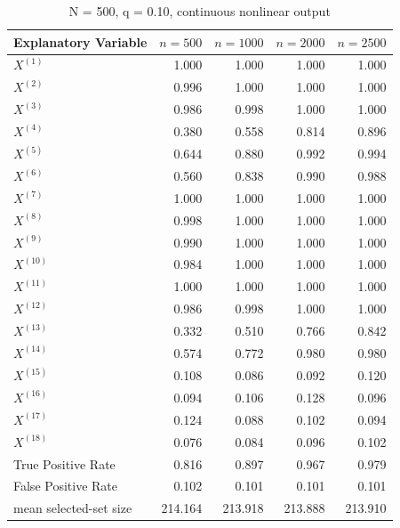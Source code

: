\documentclass[
]{article}
\begin{document}
\begin{table}

\caption{\label{tab:display-table-1}N = 500, q = 0.10, continuous nonlinear output}
\centering
\begin{tabular}[t]{lrrrr}
\toprule
Explanatory Variable & $n = 500$ & $n = 1000$ & $n = 2000$ & $n = 2500$\\
\midrule
$X^{(1)}$ & 1.000 & 1.000 & 1.000 & 1.000\\
$X^{(2)}$ & 0.996 & 1.000 & 1.000 & 1.000\\
$X^{(3)}$ & 0.986 & 0.998 & 1.000 & 1.000\\
$X^{(4)}$ & 0.380 & 0.558 & 0.814 & 0.896\\
$X^{(5)}$ & 0.644 & 0.880 & 0.992 & 0.994\\
\addlinespace
$X^{(6)}$ & 0.560 & 0.838 & 0.990 & 0.988\\
$X^{(7)}$ & 1.000 & 1.000 & 1.000 & 1.000\\
$X^{(8)}$ & 0.998 & 1.000 & 1.000 & 1.000\\
$X^{(9)}$ & 0.990 & 1.000 & 1.000 & 1.000\\
$X^{(10)}$ & 0.984 & 1.000 & 1.000 & 1.000\\
\addlinespace
$X^{(11)}$ & 1.000 & 1.000 & 1.000 & 1.000\\
$X^{(12)}$ & 0.986 & 0.998 & 1.000 & 1.000\\
$X^{(13)}$ & 0.332 & 0.510 & 0.766 & 0.842\\
$X^{(14)}$ & 0.574 & 0.772 & 0.980 & 0.980\\
$X^{(15)}$ & 0.108 & 0.086 & 0.092 & 0.120\\
\addlinespace
$X^{(16)}$ & 0.094 & 0.106 & 0.128 & 0.096\\
$X^{(17)}$ & 0.124 & 0.088 & 0.102 & 0.094\\
$X^{(18)}$ & 0.076 & 0.084 & 0.096 & 0.102\\
True Positive Rate & 0.816 & 0.897 & 0.967 & 0.979\\
False Positive Rate & 0.102 & 0.101 & 0.101 & 0.101\\
\addlinespace
mean selected-set size & 214.164 & 213.918 & 213.888 & 213.910\\
\bottomrule
\end{tabular}
\end{table}
\end{document}
